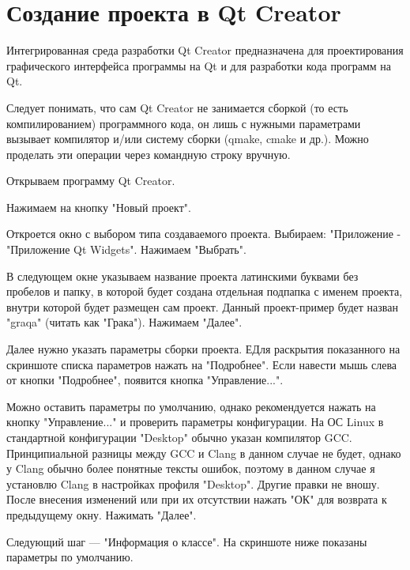 \section{Создание проекта в Qt Creator}

Интегрированная среда разработки Qt Creator предназначена для проектирования графического интерфейса программы на Qt и для разработки кода программ на Qt.

Следует понимать, что сам Qt Creator не занимается сборкой (то есть компилированием) программного кода, он лишь с нужными параметрами вызывает компилятор и/или систему сборки (qmake, cmake и др.). Можно проделать эти операции через командную строку вручную.

Открываем программу Qt Creator.

Нажимаем на кнопку "Новый проект".

Откроется окно с выбором типа создаваемого проекта. Выбираем: "Приложение - "Приложение Qt Widgets". Нажимаем "Выбрать".

В следующем окне указываем название проекта латинскими буквами без пробелов и папку, в которой будет создана отдельная подпапка с именем проекта, внутри которой будет размещен сам проект. Данный проект-пример будет назван "graqa" (читать как "Грака"). Нажимаем "Далее".

Далее нужно указать параметры сборки проекта. ЕДля раскрытия показанного на скриншоте списка параметров нажать на "Подробнее". Если навести мышь слева от кнопки "Подробнее", появится кнопка "Управление...".

Можно оставить параметры по умолчанию, однако рекомендуется нажать на кнопку "Управление..." и проверить параметры конфигурации. На ОС Linux в стандартной конфигурации "Desktop" обычно указан компилятор GCC. Принципиальной разницы между GCC и Clang в данном случае не будет, однако у Clang обычно более понятные тексты ошибок, поэтому в данном случае я установлю Clang в настройках профиля "Desktop". Другие правки не вношу. После внесения изменений или при их отсутствии нажать "ОК" для возврата к предыдущему окну. Нажимать "Далее".

Следующий шаг — "Информация о классе". На скриншоте ниже показаны параметры по умолчанию.

